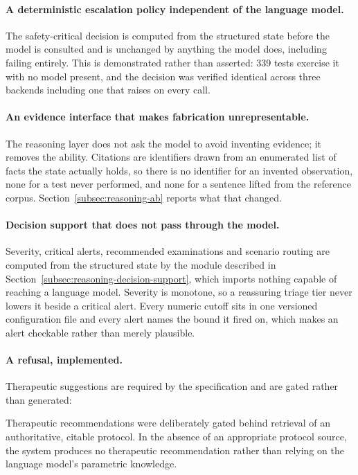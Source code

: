 \paragraph{A deterministic escalation policy independent of the language model.} The
safety-critical decision is computed from the structured state before the model is consulted and
is unchanged by anything the model does, including failing entirely. This is demonstrated rather
than asserted: 339 tests exercise it with no model present, and the decision was verified
identical across three backends including one that raises on every call.

\paragraph{An evidence interface that makes fabrication unrepresentable.} The reasoning layer
does not ask the model to avoid inventing evidence; it removes the ability. Citations are
identifiers drawn from an enumerated list of facts the state actually holds, so there is no
identifier for an invented observation, none for a test never performed, and none for a sentence
lifted from the reference corpus. Section~\ref{subsec:reasoning-ab} reports what that changed.

\paragraph{Decision support that does not pass through the model.} Severity, critical alerts,
recommended examinations and scenario routing are computed from the structured state by the
module described in Section~\ref{subsec:reasoning-decision-support}, which imports nothing
capable of reaching a language model. Severity is monotone, so a reassuring triage tier never
lowers it beside a critical alert. Every numeric cutoff sits in one versioned configuration
file and every alert names the bound it fired on, which makes an alert checkable rather than
merely plausible.

\paragraph{A refusal, implemented.} Therapeutic suggestions are required by the specification
and are gated rather than generated:

\begin{keystatement}
Therapeutic recommendations were deliberately gated behind retrieval of an authoritative,
citable protocol. In the absence of an appropriate protocol source, the system produces no
therapeutic recommendation rather than relying on the language model's parametric knowledge.
\end{keystatement}

